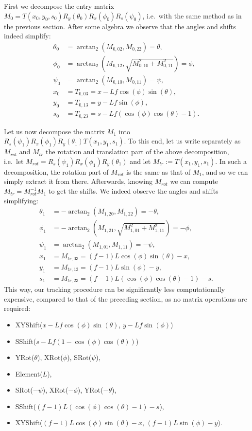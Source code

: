 First we decompose the entry matrix $M_0 = T(x_0, y_0, s_0) R_y(\theta_0) R_x(\phi_0) R_s(\psi_0)$, i.e.~with the same method as in the previous section.
After some algebra we observe that the angles and shifts indeed simplify:
\[
	\begin{aligned}
		\theta_0 &= \arctan_2(M_{0,02}, M_{0,22}) = \theta, \\
		\phi_0 &= \arctan_2(M_{0,12}, \sqrt{M_{0,10}^2 + M_{0,11}^2}) = \phi, \\
		\psi_0 &= \arctan_2(M_{0,10}, M_{0,11}) = \psi, \\
		x_0 &= T_{0,03} = x - L f \cos(\phi)\sin(\theta), \\
		y_0 &= T_{0,13} = y - L f \sin(\phi), \\
		s_0 &= T_{0,23} = s - L f (\cos(\phi)\cos(\theta) - 1).
	\end{aligned}
\]

Let us now decompose the matrix $M_1$ into $R_s(\psi_1) R_x(\phi_1) R_y(\theta_1) T(x_1, y_1, s_1)$.
To this end, let us write separately as $M_{rot}$ and $M_{tr}$ the rotation and translation part of the above decomposition, i.e.~let $M_{rot} = R_s(\psi_1) R_x(\phi_1) R_y(\theta_1)$ and let $M_{tr} := T(x_1, y_1, s_1)$.
In such a decomposition, the rotation part of $M_{rot}$ is the same as that of $M_1$, and so we can simply extract it from there.
Afterwards, knowing $M_{rot}$ we can compute $M_{tr} = M_{rot}^{-1} M_1$ to get the shifts.
We indeed observe the angles and shifts simplifying:
\[
	\begin{aligned}
		\theta_1 &= -\arctan_2(M_{1,20}, M_{1,22}) = -\theta, \\
		\phi_1 &= -\arctan_2(M_{1,21}, \sqrt{M_{1,01}^2 + M_{1,11}^2}) = -\phi, \\
		\psi_1 &= \arctan_2(M_{1,01}, M_{1,11}) = -\psi, \\
		x_1 &= M_{tr,03} = (f - 1) L \cos(\phi) \sin(\theta) - x, \\
		y_1 &= M_{tr,13} = (f - 1) L \sin(\phi) - y, \\
		s_1 &= M_{tr,23} = (f - 1) L (\cos(\phi) \cos(\theta) - 1) - s.
	\end{aligned}
\]
This way, our tracking procedure can be significantly less computationally expensive, compared to that of the preceding section, as no matrix operations are required:
	\begin{itemize}
	\item XYShift($x - L f \cos(\phi)\sin(\theta)$, $y - L f \sin(\phi)$)
	\item SShift($s - L f (1 - \cos(\phi)\cos(\theta))$)
	\item YRot($\theta$), XRot($\phi$), SRot($\psi$),
	\item Element($L$),
	\item SRot($-\psi$), XRot($-\phi$), YRot($-\theta$),
	\item SShift($(f - 1) L (\cos(\phi) \cos(\theta) - 1) - s$),
	\item XYShift($(f - 1) L \cos(\phi) \sin(\theta) - x$, $(f - 1) L \sin(\phi) - y$).
\end{itemize}


